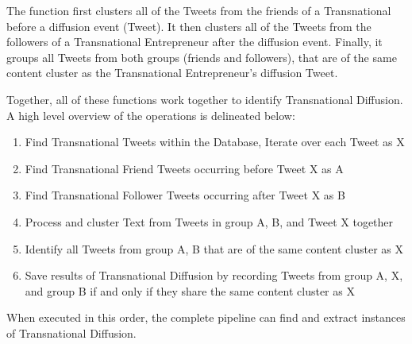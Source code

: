 The function first clusters all of the Tweets from the friends of a
Transnational before a diffusion event (Tweet). It then clusters all
of the Tweets from the followers of a Transnational Entrepreneur after
the diffusion event. Finally, it groups all Tweets from both groups
(friends and followers), that are of the same content cluster as the
Transnational Entrepreneur's diffusion Tweet.

Together, all of these functions work together to identify
Transnational Diffusion. A high level overview of the operations is
delineated below:

\begin{enumerate}
\item Find Transnational Tweets within the Database, Iterate over each
  Tweet as X
\item Find Transnational Friend Tweets occurring before Tweet X as A
\item Find Transnational Follower Tweets occurring after Tweet X as B
\item Process and cluster Text from Tweets in group A, B, and Tweet X
  together
\item Identify all Tweets from group A, B that are of the same content
  cluster as X
\item Save results of Transnational Diffusion by recording Tweets from
  group A, X, and group B if and only if they share the same content
  cluster as X
\end{enumerate}

When executed in this order, the complete pipeline can find and
extract instances of Transnational Diffusion.
